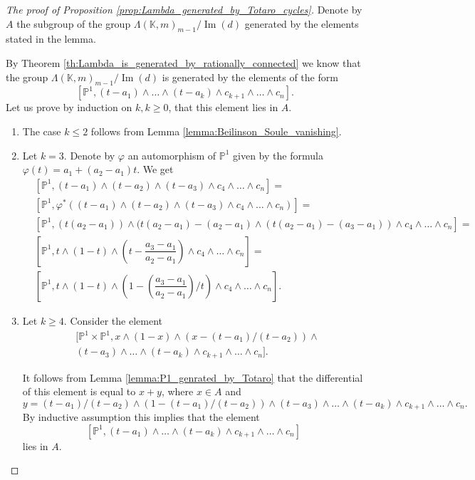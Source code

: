 \documentclass[12pt]{extarticle}
\def\mb{\mathbb}
\def\L{\Lambda}
\def\k{\mb K}
\def\ph{\varphi}
\def\t{\times}
\renewcommand{\P}{{\mb P}}
\def\wdw{\wedge\dots\wedge}
\DeclareMathOperator{\im}{Im}
\begin{document}
\begin{proof}[The proof of Proposition \ref{prop:Lambda_generated_by_Totaro_cycles}]
Denote by $A$ the subgroup of the group $\L(\k, m)_{m-1}/\im(d)$ generated by the elements stated in the lemma.

    By Theorem \ref{th:Lambda_is_generated_by_rationally_connected} we know that the group $\L(\k, m)_{m-1}/\im(d)$ is generated by the elements of the form
    $$[\P^1, (t-a_1)\wdw (t-a_k)\wedge c_{k+1}\wdw c_n].$$
    Let us prove by induction on $k, k\geq 0$, that this element lies in $A$. 
    \begin{enumerate}
        \item The case $k\leq 2$ follows from Lemma \ref{lemma:Beilinson_Soule_vanishing}.
        \item Let $k=3$. Denote by $\ph$ an automorphism of $\P^1$ given by the formula $\ph(t)=a_1+(a_2-a_1)t$. We get
        \begin{align*}
            &[\P^1, (t-a_1)\wedge (t-a_2)\wedge (t-a_3)\wedge c_4\wdw c_n]=\\&[\P^1, \ph^*((t-a_1)\wedge (t-a_2)\wedge (t-a_3)\wedge c_4\wdw c_n)]=\\
            &[\P^1, (t(a_2-a_1))\wedge (t(a_2-a_1)-(a_2-a_1)\wedge (t(a_2-a_1)-(a_3-a_1))\wedge c_4\wdw c_n]=\\
            &\left[\P^1, t\wedge (1-t)\wedge \left(t-\dfrac {a_3-a_1}{a_2-a_1}\right)\wedge c_4\wdw c_n\right]=\\
            &\left[\P^1, t\wedge (1-t)\wedge \left(1-\left(\dfrac {a_3-a_1}{a_2-a_1}\right)/t\right)\wedge c_4\wdw c_n\right].
        \end{align*}
        \item Let $k\geq 4$. Consider the element
        \begin{align*}
            &[\P^1\t\P^1, x\wedge (1-x)\wedge (x-(t-a_1)/(t-a_2))\wedge\\
            &(t-a_3)\wdw (t-a_k)\wedge c_{k+1}\wdw c_n].
        \end{align*}
    
    It follows from Lemma \ref{lemma:P1_genrated_by_Totaro} that the differential of this element is equal to $x+y$, where $x\in A$ and 
    $$y=(t-a_1)/(t-a_2)\wedge (1-(t-a_1)/(t-a_2))\wedge (t-a_3)\wdw (t-a_{k})\wedge c_{k+1}\wdw c_n.$$
    By inductive assumption this implies that the element
    $$[\P^1, (t-a_1)\wdw (t-a_k)\wedge c_{k+1}\wdw c_n]$$
    lies in $A$.
    \end{enumerate} 
    

\end{proof}
\end{document}
